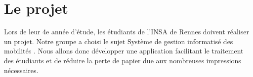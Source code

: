 
	\chapter{Le projet}
	 Lors de leur 4e année d'étude, les étudiants de l'INSA de Rennes doivent réaliser un projet. Notre groupe a choisi le sujet \og Système de gestion informatisé des mobilités \fg. Nous allons donc développer une application facilitant le traitement des étudiants et de réduire la perte de papier due aux nombreuses impressions nécessaires.
